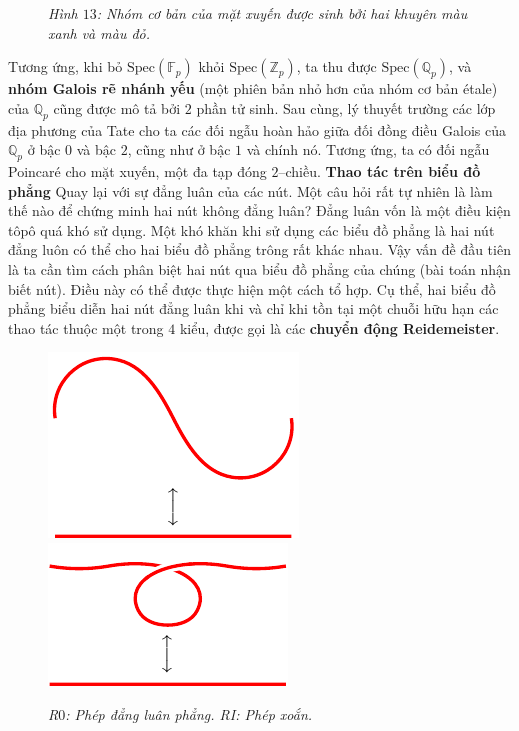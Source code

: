 \begin{multicols}{2}
\begin{figure}[H]
		\caption{\small\textit{\color{duongvaotoanhoc}Hình $13$: Nhóm cơ bản của mặt xuyến được sinh bởi hai khuyên màu xanh và màu đỏ.}}
		\vspace*{-10pt}
	\end{figure}
	Tương ứng, khi bỏ $\text{Spec}(\mathbb{F}_p)$ khỏi $\text{Spec}(\mathbb{Z}_p)$, ta thu được $\text{Spec}(\mathbb{Q}_p)$, và {\bf\color{duongvaotoanhoc} nhóm Galois rẽ nhánh yếu} (một phiên bản nhỏ hơn của nhóm cơ bản étale) của $\mathbb{Q}_p$ cũng được mô tả bởi $2$ phần tử sinh. Sau cùng, lý thuyết trường các lớp địa phương của Tate cho ta các đối ngẫu hoàn hảo giữa đối đồng điều Galois của  $\mathbb{Q}_p$ ở bậc $0$ và bậc $2$, cũng như ở bậc $1$ và chính nó. Tương ứng, ta có đối ngẫu Poincaré cho mặt xuyến, một đa tạp đóng $2$--chiều.
	\vskip 0.1cm
	\textbf{\color{duongvaotoanhoc}Thao tác trên biểu đồ phẳng}
	\vskip 0.1cm
	Quay lại với sự đẳng luân của các nút. Một câu hỏi rất tự nhiên là làm thế nào để chứng minh hai nút không đẳng luân? Đẳng luân vốn là một điều kiện tôpô quá khó sử dụng. Một khó khăn khi sử dụng các biểu đồ phẳng là hai nút đẳng luôn có thể cho hai biểu đồ phẳng trông rất khác nhau. Vậy vấn đề đầu tiên là ta cần tìm cách phân biệt hai nút qua biểu đồ phẳng của chúng (bài toán nhận biết nút). Điều này có thể được thực hiện một cách tổ hợp. Cụ thể, hai biểu đồ phẳng biểu diễn hai nút đẳng luân khi và chỉ khi tồn tại một chuỗi hữu hạn các thao tác thuộc một trong $4$ kiểu, được gọi là các {\bf\color{duongvaotoanhoc} chuyển động Reidemeister}.
	\begin{figure}[H]
		\vspace*{-5pt}
		\centering
		\captionsetup{labelformat= empty, justification=centering}
		\includegraphics[width= 0.35\linewidth]{R0.pdf}\quad
		\includegraphics[width= 0.35\linewidth]{R1.pdf}
		\caption{\small\textit{\color{duongvaotoanhoc}R$0$: Phép đẳng luân phẳng.\hspace*{20pt}  RI: Phép xoắn.}}

\end{figure}
\end{multicols}
